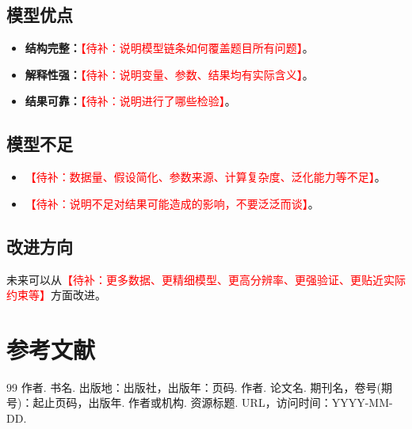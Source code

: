 \documentclass[UTF8,a4paper,zihao=5]{ctexart}
\numberwithin{equation}{section}
\numberwithin{figure}{section}
\numberwithin{table}{section}
\newcommand{\todo}[1]{\textcolor{red}{【待补：#1】}}
\begin{document}
\subsection{模型优点}
\begin{itemize}
  \item \textbf{结构完整：}\todo{说明模型链条如何覆盖题目所有问题}。
  \item \textbf{解释性强：}\todo{说明变量、参数、结果均有实际含义}。
  \item \textbf{结果可靠：}\todo{说明进行了哪些检验}。
\end{itemize}

\subsection{模型不足}
\begin{itemize}
  \item \todo{数据量、假设简化、参数来源、计算复杂度、泛化能力等不足}。
  \item \todo{说明不足对结果可能造成的影响，不要泛泛而谈}。
\end{itemize}

\subsection{改进方向}
未来可以从\todo{更多数据、更精细模型、更高分辨率、更强验证、更贴近实际约束等}方面改进。

\section*{参考文献}
\begin{thebibliography}{99}
   作者. 书名. 出版地：出版社，出版年：页码.
   作者. 论文名. 期刊名，卷号(期号)：起止页码，出版年.
   作者或机构. 资源标题. URL，访问时间：YYYY-MM-DD.
\end{thebibliography}

\appendix
\end{document}
